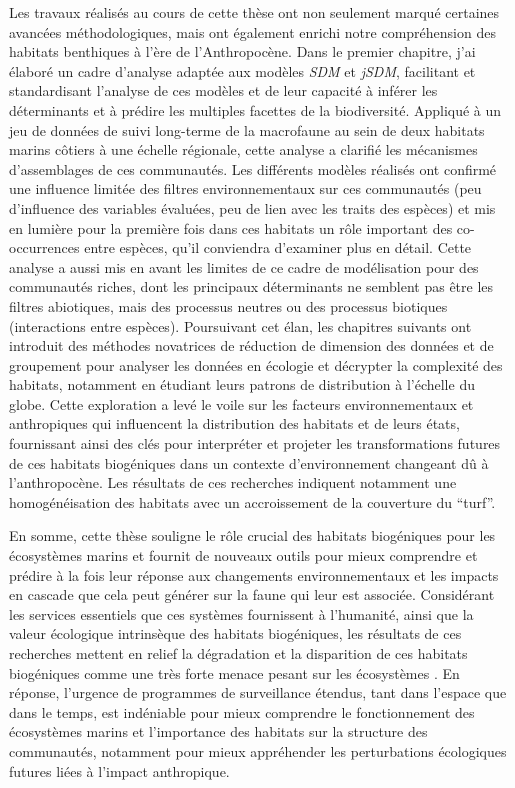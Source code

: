 \begin{refsection}
Les travaux réalisés au cours de cette thèse ont non seulement marqué
certaines avancées méthodologiques, mais ont également enrichi notre
compréhension des habitats benthiques à l'ère de l'Anthropocène. Dans le
premier chapitre, j'ai élaboré un cadre d'analyse adaptée aux modèles
\emph{SDM} et \emph{jSDM}, facilitant et standardisant l'analyse de ces
modèles et de leur capacité à inférer les déterminants et à prédire les
multiples facettes de la biodiversité. Appliqué à un jeu de données de
suivi long-terme de la macrofaune au sein de deux habitats marins
côtiers à une échelle régionale, cette analyse a clarifié les mécanismes
d'assemblages de ces communautés. Les différents modèles réalisés ont
confirmé une influence limitée des filtres environnementaux sur ces
communautés (peu d'influence des variables évaluées, peu de lien avec
les traits des espèces) et mis en lumière pour la première fois dans ces
habitats un rôle important des co-occurrences entre espèces, qu'il
conviendra d'examiner plus en détail. Cette analyse a aussi mis en avant
les limites de ce cadre de modélisation pour des communautés riches,
dont les principaux déterminants ne semblent pas être les filtres
abiotiques, mais des processus neutres \autocite{Boye_2019a} ou des
processus biotiques (interactions entre espèces). Poursuivant cet élan,
les chapitres suivants ont introduit des méthodes novatrices de
réduction de dimension des données et de groupement pour analyser les
données en écologie et décrypter la complexité des habitats, notamment
en étudiant leurs patrons de distribution à l'échelle du globe. Cette
exploration a levé le voile sur les facteurs environnementaux et
anthropiques qui influencent la distribution des habitats et de leurs
états, fournissant ainsi des clés pour interpréter et projeter les
transformations futures de ces habitats biogéniques dans un contexte
d'environnement changeant dû à l'anthropocène. Les résultats de ces
recherches indiquent notamment une homogénéisation des habitats avec un
accroissement de la couverture du ``turf''.

En somme, cette thèse souligne le rôle crucial des habitats biogéniques
pour les écosystèmes marins et fournit de nouveaux outils pour mieux
comprendre et prédire à la fois leur réponse aux changements
environnementaux et les impacts en cascade que cela peut générer sur la
faune qui leur est associée. Considérant les services essentiels que ces
systèmes fournissent à l'humanité, ainsi que la valeur écologique
intrinsèque des habitats biogéniques, les résultats de ces recherches
mettent en relief la dégradation et la disparition de ces habitats
biogéniques comme une très forte menace pesant sur les écosystèmes
\autocite{ipbes_2019}. En réponse, l'urgence de programmes de
surveillance étendus, tant dans l'espace que dans le temps, est
indéniable pour mieux comprendre le fonctionnement des écosystèmes
marins et l'importance des habitats sur la structure des communautés,
notamment pour mieux appréhender les perturbations écologiques futures
liées à l'impact anthropique.

\clearpage

\printbibliography[heading=subbibintoc, title={Bibliographie}]
\end{refsection}